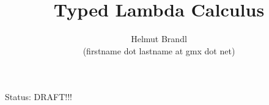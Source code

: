 \documentclass[12pt]{article}
\begin{document}
\title{Typed Lambda Calculus}
\author{Helmut Brandl \\ \scriptsize (firstname dot lastname at gmx dot net)}
\date{}


\maketitle

\abstract{
}

Status: DRAFT!!!

\tableofcontents
















\appendix


\end{document}
